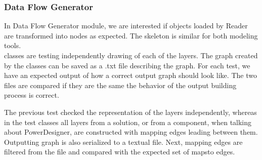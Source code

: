 \subsubsection{Data Flow Generator}

In Data Flow Generator module, we are interested if objects loaded by Reader are transformed into nodes as expected.
The skeleton is similar for both modeling tools. \\

 classes are testing independently drawing of each of the layers. The graph created by the  classes can be saved as a .txt file describing the graph. 
For each test, we have an expected output of how a correct output graph should look like. The two files are compared if they are the same the behavior of the output building process is correct.

The previous test checked the representation of the layers independently, whereas in the test classes  all layers from a solution, or from a component, when talking about PowerDesigner, are constructed with mapping edges leading between them. Outputting graph is also serialized to a textual file. Next, mapping edges are filtered from the file and compared with the expected set of maps\textunderscore to edges. 